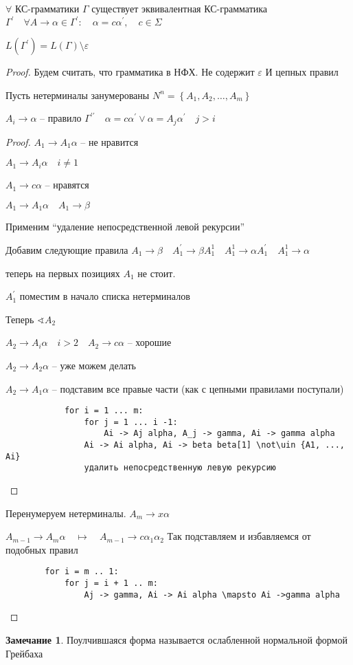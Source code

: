 \documentclass{book}
\newcommand{\p}[1]{#1^{\prime}}
\newcommand{\pp}[1]{#1^{\prime\prime}}
\theoremstyle{definition}
\newtheorem*{note}{Замечание}
\begin{document}
\begin{theorem}
    $\forall $ КС-грамматики $\Gamma$ существует эквивалентная КС-грамматика  $\p {\Gamma}\quad \forall A \to \alpha \in \p {\Gamma}:\quad \alpha = c\p \alpha,\quad  c\in \Sigma$

    $L(\p \Gamma) = L(\Gamma) \setminus \varepsilon$
\end{theorem}
\begin{proof}
    Будем считать, что грамматика в НФХ. Не содержит $\varepsilon$ И цепных правил

    \begin{lemma}
        Пусть нетерминалы занумерованы  $N^n = \left\{ A_1, A_2, \ldots, A_m \right\} $

        $A_i \to \alpha$ -- правило $\pp \Gamma\quad \alpha = c\p \alpha \lor \alpha = A_j\p \alpha\quad j > i$
    \end{lemma}
    \begin{proof}
        $A_1 \to A_1\alpha$ -- не нравится

        $A_1 \to  A_i\alpha\quad i\neq 1$

        $A_1 \to  c\alpha$ -- нравятся

        $A_1 \to A_1\alpha\quad A_1 \to \beta$

        Применим ``удаление непосредственной левой рекурсии''

        Добавим следующие правила  $A_1 \to \beta \quad \p A_1 \to \beta A_1^1\quad A_1^1 \to \alpha \p A_1\quad A_1^1 \to \alpha$ 

        теперь на первых позициях $A_1$  не стоит.

        $\p A_1$ поместим в начало списка нетерминалов

        Теперь $\sphericalangle A_2$

        $A_2 \to A_i\alpha\quad i > 2\quad A_2 \to c\alpha$ -- хорошие

        $A_2 \to A_2\alpha$ -- уже можем делать

        $A_2 \to A_1\alpha$ -- подставим все правые части (как с цепными правилами поступали)

        \begin{lstlisting}
            for i = 1 ... m:
                for j = 1 ... i -1:
                    Ai -> Aj alpha, A_j -> gamma, Ai -> gamma alpha
                Ai -> Ai alpha, Ai -> beta beta[1] \not\uin {A1, ..., Ai}
                удалить непосредственную левую рекурсию
        \end{lstlisting}
    \end{proof}


    Перенумеруем нетерминалы. $A_m \to x\alpha$

    $A _{m-1} \to A_m \alpha\quad \mapsto\quad A_{m-1} \to c\alpha_1 \alpha_2 $ Так подставляем и избавляемся от подобных правил

    \begin{lstlisting}
        for i = m .. 1:
            for j = i + 1 .. m:
                Aj -> gamma, Ai -> Ai alpha \mapsto Ai ->gamma alpha
    \end{lstlisting}
\end{proof}

\begin{note}
    Поулчившаяся форма называется ослабленной нормальной формой Грейбаха
\end{note}
\end{document}
